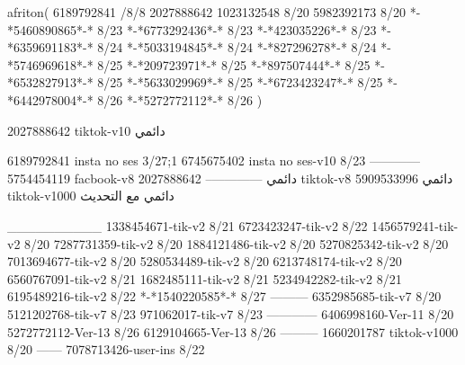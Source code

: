 afriton(
6189792841 /8/8
2027888642
1023132548 8/20
5982392173 8/20
*-*5460890865*-* 8/23
*-*6773292436*-* 8/23
*-*423035226*-* 8/23
*-*6359691183*-* 8/24
*-*5033194845*-* 8/24
*-*827296278*-* 8/24
*-*5746969618*-* 8/25
*-*209723971*-* 8/25
*-*897507444*-* 8/25
*-*6532827913*-* 8/25
*-*5633029969*-* 8/25
*-*6723423247*-* 8/25
*-*6442978004*-* 8/26
*-*5272772112*-* 8/26
)

2027888642 tiktok-v10
دائمي

6189792841 insta no ses
3/27;1
6745675402 insta no ses-v10
8/23
------------
5754454119 facbook-v8
دائمي
--------------
2027888642 tiktok-v8
دائمي
5909533996 tiktok-v1000
دائمي مع التحديث

__________
1338454671-tik-v2
8/21
6723423247-tik-v2
8/22
1456579241-tik-v2
8/20
7287731359-tik-v2
8/20
1884121486-tik-v2
8/20
5270825342-tik-v2
8/20
7013694677-tik-v2
8/20
5280534489-tik-v2
8/20
6213748174-tik-v2
8/20
6560767091-tik-v2
8/21
1682485111-tik-v2
8/21
5234942282-tik-v2
8/21
6195489216-tik-v2
8/22
*-*1540220585*-* 8/27
---------
6352985685-tik-v7
8/20
5121202768-tik-v7
8/23
971062017-tik-v7
8/23
------------
6406998160-Ver-11
8/20
5272772112-Ver-13
8/26
6129104665-Ver-13
8/26
---------
1660201787 tiktok-v1000
8/20
------
7078713426-user-ins
8/22
